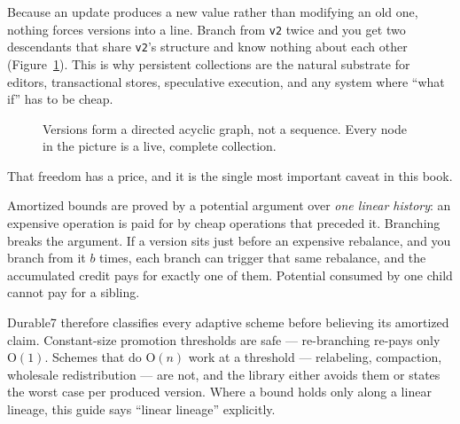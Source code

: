 \documentclass[11pt,twoside,openright]{book}
\newcommand{\code}[1]{\texorpdfstring{\textcolor{d7ink}{\texttt{#1}}}{#1}}
\newcommand{\bigoh}[1]{$\mathrm{O}(#1)$}
\begin{document}
Because an update produces a new value rather than modifying an old one, nothing
forces versions into a line. Branch from \code{v2} twice and you get two
descendants that share \code{v2}'s structure and know nothing about each other
(Figure~\ref{fig:versiondag}). This is why persistent collections are the natural
substrate for editors, transactional stores, speculative execution, and any
system where ``what if'' has to be cheap.

\begin{figure}[htbp]
\centering
{}
\caption{Versions form a directed acyclic graph, not a sequence. Every node in
the picture is a live, complete collection.}
\label{fig:versiondag}
\end{figure}

That freedom has a price, and it is the single most important caveat in this
book.

\begin{caveatbox}
Amortized bounds are proved by a potential argument over \emph{one linear
history}: an expensive operation is paid for by cheap operations that preceded
it. Branching breaks the argument. If a version sits just before an expensive
rebalance, and you branch from it $b$ times, each branch can trigger that same
rebalance, and the accumulated credit pays for exactly one of them. Potential
consumed by one child cannot pay for a sibling.

Durable7 therefore classifies every adaptive scheme before believing its
amortized claim. Constant-size promotion thresholds are safe --- re-branching
re-pays only \bigoh{1}. Schemes that do \bigoh{n} work at a threshold ---
relabeling, compaction, wholesale redistribution --- are not, and the library
either avoids them or states the worst case per produced version. Where a bound
holds only along a linear lineage, this guide says ``linear lineage''
explicitly.
\end{caveatbox}
\end{document}
